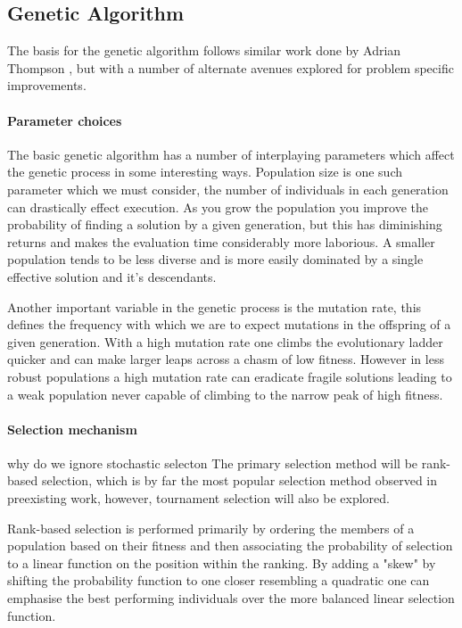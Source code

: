 \subsection{Genetic Algorithm}

The basis for the genetic algorithm follows similar work done by Adrian Thompson
\cite{10.1007/3-540-63173-9_61}, but with a number of alternate avenues explored
for problem specific improvements.

\paragraph{Parameter choices}
The basic genetic algorithm has a number of interplaying parameters which affect the genetic
process in some interesting ways. Population size is one such parameter which we must consider,
the number of individuals in each generation can drastically effect execution. As you grow the
population you improve the probability of finding a solution by a given generation, but this has
diminishing returns and makes the evaluation time considerably more laborious. A smaller population
tends to be less diverse and is more easily dominated by a single effective solution
and it's descendants.

Another important variable in the genetic process is the mutation rate, this defines the
frequency with which we are to expect mutations in the offspring of a given generation.
With a high mutation rate one climbs the evolutionary ladder quicker and can make larger
leaps across a chasm of low fitness. However in less robust populations a high mutation rate
can eradicate fragile solutions leading to a weak population never capable of
climbing to the narrow peak of high fitness.

\paragraph{Selection mechanism}
\todo why do we ignore stochastic selecton
The primary selection method will be rank-based selection, which is by far
the most popular selection method observed in preexisting work, however,
tournament selection will also be explored.

Rank-based selection is performed primarily by ordering the members of a population
based on their fitness and then associating the probability of selection to a
linear function on the
position within the ranking. By adding a "skew" by shifting the probability function
to one closer resembling a quadratic one can emphasise the best performing
individuals over the more balanced linear selection function.

